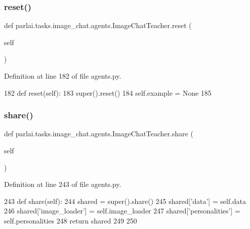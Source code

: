 \subsubsection{\texorpdfstring{reset()}{reset()}}
{\footnotesize\ttfamily def parlai.\+tasks.\+image\+\_\+chat.\+agents.\+Image\+Chat\+Teacher.\+reset (\begin{DoxyParamCaption}\item[{}]{self }\end{DoxyParamCaption})}



Definition at line 182 of file agents.\+py.


\begin{DoxyCode}
182     \textcolor{keyword}{def }reset(self):
183         super().reset()
184         self.example = \textcolor{keywordtype}{None}
185 
\end{DoxyCode}
\mbox{\label{classparlai_1_1tasks_1_1image__chat_1_1agents_1_1ImageChatTeacher_a5208845ef2ccb323991101b60bf76396}} 
\subsubsection{\texorpdfstring{share()}{share()}}
{\footnotesize\ttfamily def parlai.\+tasks.\+image\+\_\+chat.\+agents.\+Image\+Chat\+Teacher.\+share (\begin{DoxyParamCaption}\item[{}]{self }\end{DoxyParamCaption})}



Definition at line 243 of file agents.\+py.


\begin{DoxyCode}
243     \textcolor{keyword}{def }share(self):
244         shared = super().share()
245         shared[\textcolor{stringliteral}{'data'}] = self.data
246         shared[\textcolor{stringliteral}{'image\_loader'}] = self.image\_loader
247         shared[\textcolor{stringliteral}{'personalities'}] = self.personalities
248         \textcolor{keywordflow}{return} shared
249 
250 
\end{DoxyCode}
\mbox{\label{classparlai_1_1tasks_1_1image__chat_1_1agents_1_1ImageChatTeacher_a6028198a57fccc50c4c7f4f294ed1f33}} 
